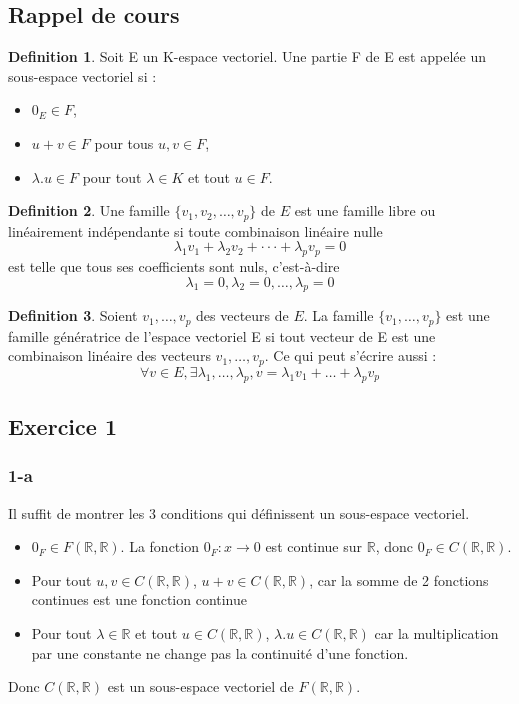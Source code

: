\documentclass[]{book}
\theoremstyle{definition}
\newtheorem{defn}{Definition}
\newcommand{\bb}[1]{\mathbb{#1}}
\newcommand{\R}{\bb{R}}
\begin{document}
\subsection*{Rappel de cours}

\begin{defn}
Soit E un K-espace vectoriel. Une partie F de E est appelée un sous-espace vectoriel si :
\begin{itemize}
\item $0_E \in F$,
\item $u + v \in F$ pour tous $u, v \in F$,
\item $\lambda.u \in F$ pour tout $\lambda \in K$ et tout $u \in F$.
\end{itemize}
\end{defn}


\begin{defn}
Une famille $\{v_1, v_2, \ldots , v_p\}$ de $E$ est une famille libre ou lin\'eairement ind\'ependante si toute combinaison lin\'eaire nulle
$$\lambda_1v_1 + \lambda_2v_2 + ··· + \lambda_p v_p = 0$$
est telle que tous ses coefficients sont nuls, c’est-\`a-dire
$$\lambda_1 = 0, \lambda_2 = 0, \ldots, \lambda_p = 0$$
\end{defn}



\begin{defn}
Soient $v_1, \ldots, v_p$ des vecteurs de $E$. La famille $\{v_1, \ldots, v_p\}$ est une famille g\'en\'eratrice de l'espace vectoriel E si tout vecteur de E est une combinaison lin\'eaire des vecteurs $v_1, \ldots, v_p$. Ce qui peut s'\'ecrire aussi :
$$\forall v \in E, \exists \lambda_1, \ldots, \lambda_p, v = \lambda_1 v_1 + \ldots + \lambda_p v_p$$
\end{defn}


\newpage
\subsection*{Exercice 1}
\subsubsection*{1-a}

Il suffit de montrer les 3 conditions qui d\'efinissent un sous-espace vectoriel.
\begin{itemize}
\item $0_F \in F(\R,\R)$. La fonction $0_F:x\to 0$ est continue sur $\R$, donc $0_F \in C(\R,\R)$.
\item Pour tout $u, v \in C(\R,\R)$, $u + v \in C(\R,\R)$, car la somme de 2 fonctions continues est une fonction continue 
\item Pour tout $\lambda \in \R$ et tout $u \in C(\R,\R)$, $\lambda.u \in C(\R,\R)$ car la multiplication par une constante ne change pas la continuit\'e d'une fonction.
\end{itemize}
Donc $C(\R,\R)$ est un sous-espace vectoriel de $F(\R,\R)$.
\end{document}
